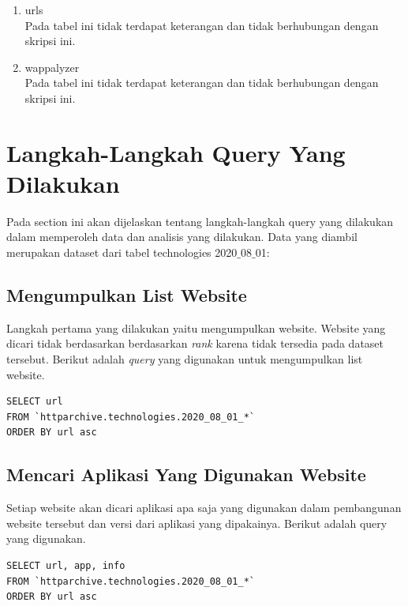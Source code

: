 \begin{enumerate}
\item urls\\
Pada tabel ini tidak terdapat keterangan dan tidak berhubungan dengan skripsi ini.
\item wappalyzer\\
Pada tabel ini tidak terdapat keterangan dan tidak berhubungan dengan skripsi ini.
\end{enumerate}

\section{Langkah-Langkah Query Yang Dilakukan}
Pada section ini akan dijelaskan tentang langkah-langkah query yang dilakukan dalam memperoleh data dan analisis yang dilakukan. Data yang diambil merupakan dataset dari tabel technologies 2020$\_$08$\_$01:

\subsection{Mengumpulkan List Website}
Langkah pertama yang dilakukan yaitu mengumpulkan website. Website yang dicari tidak berdasarkan berdasarkan \textit{rank} karena tidak tersedia pada dataset tersebut. Berikut adalah \textit{query} yang digunakan untuk mengumpulkan list website.
\begin{verbatim}
SELECT url
FROM `httparchive.technologies.2020_08_01_*`
ORDER BY url asc
\end{verbatim}

\subsection{Mencari Aplikasi Yang Digunakan Website}
Setiap website akan dicari aplikasi apa saja yang digunakan dalam pembangunan website tersebut dan versi dari aplikasi yang dipakainya. Berikut adalah query yang digunakan.
\begin{verbatim}
SELECT url, app, info
FROM `httparchive.technologies.2020_08_01_*`
ORDER BY url asc
\end{verbatim}

